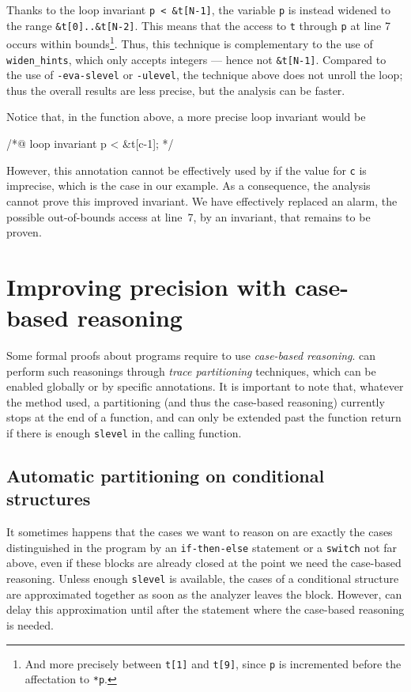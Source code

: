 \documentclass{frama-c-book}
\begin{document}
Thanks to the loop invariant \lstinline|p < &t[N-1]|, the variable
\lstinline+p+ is
instead widened to the range \lstinline+&t[0]..&t[N-2]+.
This means that the access to \lstinline+t+
through \lstinline+p+ at line 7 occurs
within bounds\footnote{And more precisely between \lstinline+t[1]+ and
\lstinline+t[9]+, since \lstinline+p+
is incremented before the affectation to \lstinline+*p+.}.
Thus, this technique is complementary to the use of
\lstinline+widen_hints+, which only accepts integers --- hence not
\lstinline+&t[N-1]+. Compared to the use
of \lstinline+-eva-slevel+ or \lstinline+-ulevel+,
the technique above does not unroll the loop; thus the overall results
are less precise, but the analysis can be faster.

Notice that, in the function above, a more precise loop invariant would be
\begin{listing-nonumber}
/*@ loop invariant p < &t[c-1]; */
\end{listing-nonumber}
However, this annotation cannot be effectively used by \Eva{}
if the value for \lstinline+c+ is imprecise, which is the case in our
example. As a consequence, the analysis cannot prove this improved invariant.
We have effectively replaced an alarm, the possible out-of-bounds access at
line~7, by an invariant, that remains to be proven.


\section{Improving precision with case-based reasoning}
\label{trace-partitioning}

Some formal proofs about programs require to use \emph{case-based reasoning}.
\Eva{} can perform such reasonings through \emph{trace partitioning}
\cite{trace-partitioning} techniques, which can be enabled globally or
by specific annotations. It is important to note that, whatever the method used,
a partitioning (and thus the case-based reasoning) currently stops at the end of
a function, and can only be extended past the function return if there is enough
\lstinline|slevel| in the calling function.


\subsection{Automatic partitioning on conditional structures}

It sometimes happens that the cases we want to reason on are exactly the
cases distinguished in the program by an \lstinline|if-then-else| statement or a
\lstinline|switch| not far above, even if these blocks are already closed
at the point we need the case-based reasoning. Unless enough
\lstinline|slevel| is available, the cases of a conditional structure are
approximated together as soon as the analyzer leaves the block. However, \Eva{}
can delay this approximation until after the statement where the case-based
reasoning is needed.
\end{document}
